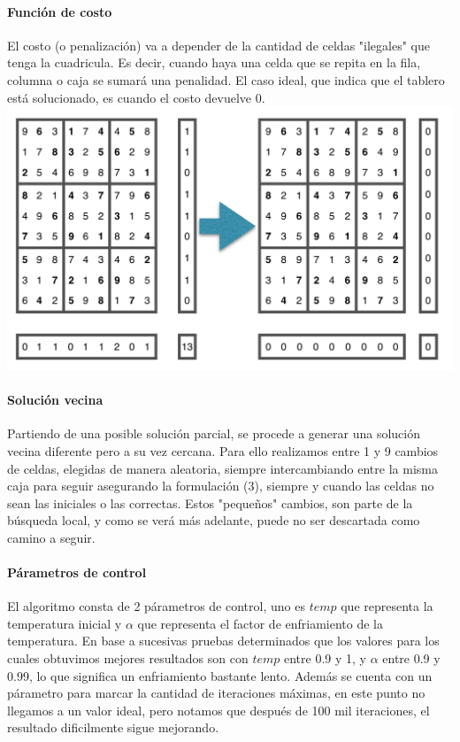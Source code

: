 \paragraph{Función de costo}
El costo (o penalización) va a depender de la cantidad de celdas "ilegales" que tenga la cuadricula. Es decir, cuando haya una celda que se repita en la fila, columna o caja se sumará una penalidad. El caso ideal, que indica que el tablero está solucionado, es cuando el costo devuelve 0.\\
\includegraphics[scale=0.6]{imgs/costo.png}	
\paragraph{Solución vecina}
Partiendo de una posible solución parcial, se procede a generar una solución vecina diferente pero a su vez cercana. Para ello realizamos entre 1 y 9 cambios de celdas, elegidas de manera aleatoria, siempre intercambiando entre la misma caja para seguir asegurando la formulación (3), siempre y cuando las celdas no sean las iniciales o las correctas. Estos "pequeños" cambios, son parte de la búsqueda local, y como se verá más adelante, puede no ser descartada como camino a seguir.
\paragraph{Párametros de control}
El algoritmo consta de 2 párametros de control, uno es $temp$ que representa la temperatura inicial y $\alpha$ que representa el factor de enfriamiento de la temperatura. En base a sucesivas pruebas determinados que los valores para los cuales obtuvimos mejores resultados son con $temp$ entre 0.9 y 1, y $\alpha$ entre 0.9 y 0.99, lo que significa un enfriamiento bastante lento.
Además se cuenta con un párametro para marcar la cantidad de iteraciones máximas, en este punto no llegamos a un valor ideal, pero notamos que después de 100 mil iteraciones, el resultado dificilmente sigue mejorando.
